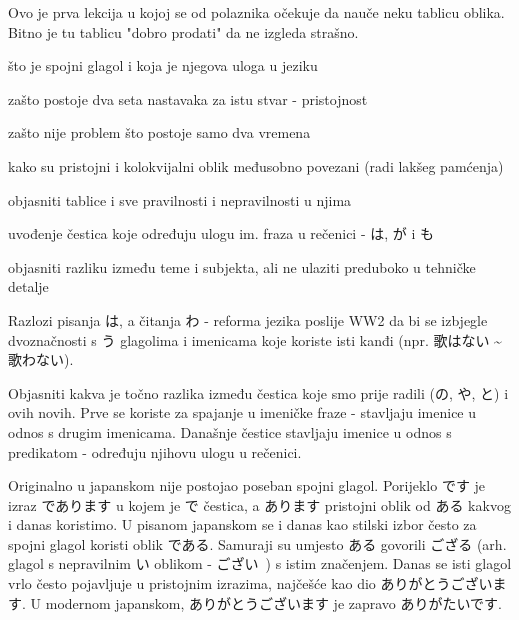 
\author{Tomislav Mamić}

	
	Ovo je prva lekcija u kojoj se od polaznika očekuje da nauče neku tablicu oblika. Bitno je tu tablicu "dobro prodati" da ne izgleda strašno.
	
	
	\begin{hyou}
		\item što je spojni glagol i koja je njegova uloga u jeziku
		\item zašto postoje dva seta nastavaka za istu stvar - pristojnost
		\item zašto nije problem što postoje samo dva vremena
		\item kako su pristojni i kolokvijalni oblik međusobno povezani (radi lakšeg pamćenja)
		\item objasniti tablice i sve pravilnosti i nepravilnosti u njima
		\item uvođenje čestica koje određuju ulogu im. fraza u rečenici - は, が i も
		\item objasniti razliku između teme i subjekta, ali ne ulaziti preduboko u tehničke detalje
	\end{hyou}

	
	\begin{hyou}
		\item Razlozi pisanja は, a čitanja わ - reforma jezika poslije WW2 da bi se izbjegle dvoznačnosti s う glagolima i imenicama koje koriste isti kanđi (npr. 歌はない \textasciitilde 歌わない).
		\item Objasniti kakva je točno razlika između čestica koje smo prije radili (の, や, と) i ovih novih. Prve se koriste za spajanje u imeničke fraze - stavljaju imenice u odnos s drugim imenicama. Današnje čestice stavljaju imenice u odnos s predikatom - određuju njihovu ulogu u rečenici.
	\end{hyou}
	
	
	Originalno u japanskom nije postojao poseban spojni glagol. Porijeklo です je izraz であります u kojem je で čestica, a あります pristojni oblik od ある kakvog i danas koristimo. U pisanom japanskom se i danas kao stilski izbor često za spojni glagol koristi oblik である. Samuraji su umjesto ある govorili ござる (arh. glagol s nepravilnim い oblikom - ござい~) s istim značenjem. Danas se isti glagol vrlo često pojavljuje u pristojnim izrazima, najčešće kao dio ありがとうございます. U modernom japanskom, ありがとうございます je zapravo ありがたいです.
